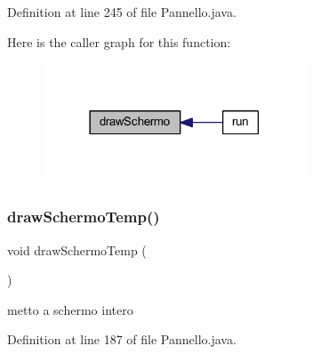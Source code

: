 Definition at line 245 of file Pannello.\+java.

Here is the caller graph for this function\+:
\nopagebreak
\begin{figure}[H]
\begin{center}
\leavevmode
\includegraphics[width=222pt]{classa_1_1survival_1_1game_1_1_pannello_ab07487900bba57d73694e694968a1993_icgraph}
\end{center}
\end{figure}
\mbox{\label{classa_1_1survival_1_1game_1_1_pannello_a65c6d6be4b2a0069d1920cb7f466643b}} 
\subsubsection{\texorpdfstring{draw\+Schermo\+Temp()}{drawSchermoTemp()}}
{\footnotesize\ttfamily void draw\+Schermo\+Temp (\begin{DoxyParamCaption}{ }\end{DoxyParamCaption})}



metto a schermo intero 



Definition at line 187 of file Pannello.\+java.

